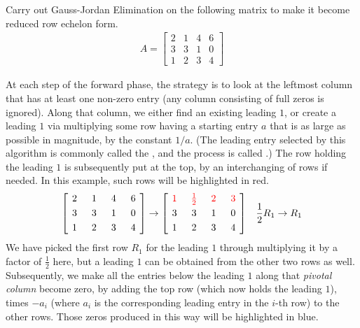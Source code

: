 \begin{exmp}
Carry out Gauss-Jordan Elimination on the following matrix to make it become reduced row echelon form.
\begin{align*}
A =
\begin{bmatrix}
2 & 1 & 4 & 6 \\
3 & 3 & 1 & 0 \\
1 & 2 & 3 & 4
\end{bmatrix}    
\end{align*}
\end{exmp}
\begin{solution}
At each step of the forward phase, the strategy is to look at the leftmost column that has at least one non-zero entry (any column consisting of full zeros is ignored). Along that column, we either find an existing leading $1$, or create a leading $1$ via multiplying some row having a starting entry $a$ that is as large as possible in magnitude, by the constant $1/a$. (The leading entry selected by this algorithm is commonly called the , and the process is called .) The row holding the leading $1$ is subsequently put at the top, by an interchanging of rows if needed. In this example, such rows will be highlighted in red.
\begin{align*}
\left[\begin{array}{@{\,}wc{10pt}wc{10pt}wc{10pt}wc{10pt}@{\,}}
2 & 1 & 4 & 6 \\[3pt]
3 & 3 & 1 & 0 \\[3pt]
1 & 2 & 3 & 4
\end{array}\right]
&\to
\left[\begin{array}{@{\,}wc{10pt}wc{10pt}wc{10pt}wc{10pt}@{\,}}
\mathcolor{red}{1} & \mathcolor{red}{\frac{1}{2}} & \mathcolor{red}{2} & \mathcolor{red}{3} \\[3pt]
3 & 3 & 1 & 0 \\[3pt]
1 & 2 & 3 & 4
\end{array}\right]
& \frac{1}{2}R_1 \to R_1
\end{align*}
We have picked the first row $R_1$ for the leading $1$ through multiplying it by a factor of $\frac{1}{2}$ here, but a leading $1$ can be obtained from the other two rows as well. Subsequently, we make all the entries below the leading $1$ along that \textit{pivotal column} become zero, by adding the top row (which now holds the leading $1$), times $-a_i$ (where $a_i$ is the corresponding leading entry in the $i$-th row) to the other rows. Those zeros produced in this way will be highlighted in blue.

\end{solution}
